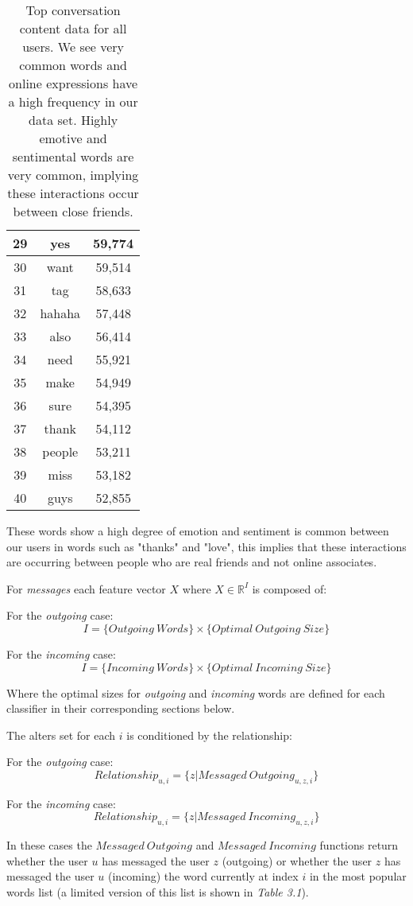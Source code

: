 \begin{table}[!htbp]
\begin{minipage}[b]{.5\textwidth}
\begin{tabular}{|c|c|c|}
		29 & yes & 59,774 \\ \hline
		30 & want & 59,514 \\ \hline
		31 & tag & 58,633 \\ \hline
		32 & hahaha & 57,448 \\ \hline
		33 & also & 56,414 \\ \hline
		34 & need & 55,921 \\ \hline
		35 & make & 54,949 \\ \hline
		36 & sure & 54,395 \\ \hline
		37 & thank & 54,112 \\ \hline
		38 & people & 53,211 \\ \hline
		39 & miss & 53,182 \\ \hline
		40 & guys & 52,855 \\ \hline
	\end{tabular}
\end{minipage}
	\caption{Top conversation content data for all users. We see very common words and online expressions have a high frequency in
	our data set. Highly emotive and sentimental words are very common, implying these interactions occur between close friends.}
	\label{tab:revpol}
\end{table}

These words show a high degree of emotion and sentiment is common between our users in words such as "thanks" and "love", 
this implies that these interactions are occurring between people who are real friends and not online associates.

For \emph{messages} each feature vector $X$ where $X \in \mathbb{R}^I$ is composed of:

For the \emph{outgoing} case:
\[ I = \{Outgoing \ Words\} \times \{Optimal \ Outgoing \ Size\} \]

For the \emph{incoming} case:
\[ I = \{Incoming \ Words\} \times \{Optimal \ Incoming \ Size\} \]

Where the optimal sizes for \emph{outgoing} and \emph{incoming} words are defined for each classifier in their corresponding sections below.

The alters set for each $i$ is conditioned by the relationship:

For the \emph{outgoing} case:
\[ Relationship_{u,i} = \{z | Messaged \ Outgoing_{u,z,i}\} \]

For the \emph{incoming} case:
\[ Relationship_{u,i} = \{z | Messaged \ Incoming_{u,z,i}\} \]

In these cases the $Messaged \ Outgoing$ and $Messaged \ Incoming$ functions return whether the user $u$ has messaged the user $z$ (outgoing) 
or whether the user $z$ has messaged the user $u$ (incoming) the word currently at index $i$ in the most popular words list (a limited version of this list is shown in \emph{Table 3.1}).

